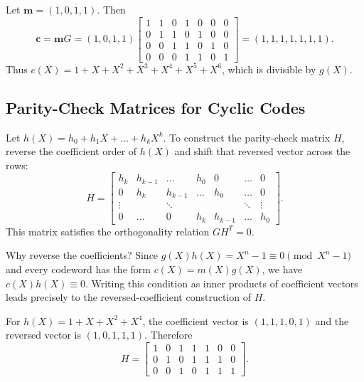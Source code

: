 \begin{example}
Let \(\mathbf{m}=(1,0,1,1)\). Then
\[\mathbf{c} = \mathbf{m}G = (1,0,1,1)
\begin{bmatrix}
1 & 1 & 0 & 1 & 0 & 0 & 0 \\
0 & 1 & 1 & 0 & 1 & 0 & 0 \\
0 & 0 & 1 & 1 & 0 & 1 & 0 \\
0 & 0 & 0 & 1 & 1 & 0 & 1
\end{bmatrix}=(1,1,1,1,1,1,1).\]
Thus \(c(X)=1+X+X^2+X^3+X^4+X^5+X^6\), which is divisible by \(g(X)\).
\end{example}

\newpage
\subsection{Parity-Check Matrices for Cyclic Codes}

Let \(h(X)=h_0+h_1X+\dots+h_kX^k\). To construct the parity-check matrix \(H\), reverse the coefficient order of \(h(X)\) and shift that reversed vector across the rows:
\[H = \begin{bmatrix}
h_k & h_{k-1} & \dots & h_0 & 0 & \dots & 0 \\
0 & h_k & h_{k-1} & \dots & h_0 & \dots & 0 \\
\vdots & & \ddots & & & \ddots & \vdots \\
0 & \dots & 0 & h_k & h_{k-1} & \dots & h_0
\end{bmatrix}.\]
This matrix satisfies the orthogonality relation \(GH^T=0\).

\begin{remark}
Why reverse the coefficients? Since \(g(X)h(X)=X^n-1 \equiv 0 \pmod{X^n-1}\) and every codeword has the form \(c(X)=m(X)g(X)\), we have \(c(X)h(X) \equiv 0\). Writing this condition as inner products of coefficient vectors leads precisely to the reversed-coefficient construction of \(H\).
\end{remark}

\begin{example}
For \(h(X)=1+X+X^2+X^4\), the coefficient vector is \((1,1,1,0,1)\) and the reversed vector is \((1,0,1,1,1)\). Therefore
\[H = \begin{bmatrix}
1 & 0 & 1 & 1 & 1 & 0 & 0 \\
0 & 1 & 0 & 1 & 1 & 1 & 0 \\
0 & 0 & 1 & 0 & 1 & 1 & 1
\end{bmatrix}.\]
\end{example}

